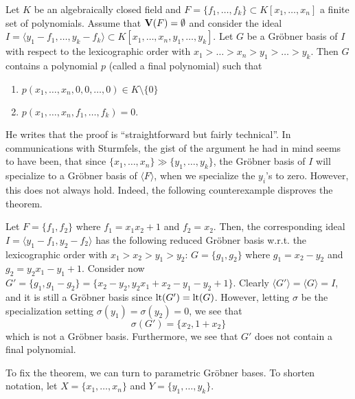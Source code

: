 \begin{theorem}
  Let $K$ be an algebraically closed field and $F = \{f_{1}, \dots, f_{k}\} \subset K[x_{1}, \dots, x_{n}]$ a finite set of polynomials. Assume that $\operatorname{\mathbf V}(F) = \emptyset$ and consider the ideal $I = \langle y_{1} - f_{1}, \dots, y_{k} - f_{k} \rangle \subset K[x_{1}, \dots, x_{n}, y_{1}, \dots, y_{k}]$. Let $G$ be a Gröbner basis of $I$ with respect to the lexicographic order with $x_{1} > \dots > x_{n} > y_{1} > \dots > y_{k}$. Then $G$ contains a polynomial $p$ (called a final polynomial) such that
  \begin{enumerate}
    \item $p(x_{1}, \dots, x_{n}, 0, 0, \dots, 0) \in K \setminus \{0\}$
    \item $p(x_{1}, \dots, x_{n}, f_{1}, \dots, f_{k}) = 0$.
  \end{enumerate}
\end{theorem}

He writes that the proof is ``straightforward but fairly technical''. In communications with Sturmfels, the gist of the argument he had in mind seems to have been, that since $\{x_{1}, \dots, x_{n}\} \gg \{y_{1}, \dots, y_{k}\}$, the Gröbner basis of $I$ will specialize to a Gröbner basis of $\langle F \rangle$, when we specialize the $y_{i}$'s to zero. However, this does not always hold. Indeed, the following counterexample disproves the theorem.

\begin{example}\upshape
  Let $F = \{f_{1}, f_{2}\}$ where $f_{1} = x_{1} x_{2} + 1$ and $f_{2} = x_{2}$. Then, the corresponding ideal
  $I = \langle y_{1} - f_{1}, y_{2} - f_{2} \rangle$ has the following reduced Gröbner basis w.r.t. the lexicographic order with $x_{1} > x_{2} > y_{1} > y_{2}$: $G =  \{g_{1}, g_{2}\}$ where $g_{1} = x_{2} - y_{2}$ and $ g_{2} = y_{2}x_{1} - y_{1} + 1$. Consider now $G' = \{g_{1}, g_{1} - g_{2}\} = \{x_{2} - y_{2}, y_{2}x_{1} + x_{2} - y_{1} - y_{2} + 1\}$. Clearly $\langle G' \rangle = \langle G \rangle = I$, and it is still a Gröbner basis since $\operatorname{lt}(G') = \operatorname{lt}(G)$. However, letting $\sigma$ be the specialization setting $\sigma(y_{1}) = \sigma(y_{2}) = 0$, we see that
  \[\sigma(G') = \{x_{2}, 1+x_{2}\}\]
  which is not a Gröbner basis. Furthermore, we see that $G'$ does not contain a final polynomial.
\end{example}

To fix the theorem, we can turn to parametric Gröbner bases. To shorten notation, let $X = \{x_{1}, \dots, x_{n}\}$ and $Y = \{y_{1}, \dots, y_{k}\}$.

